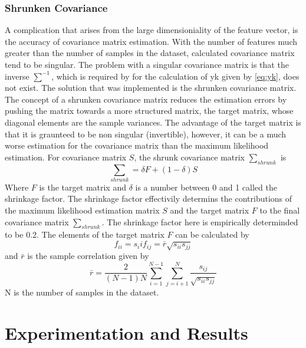 \documentclass[12pt, a4paper, fleqn]{memoir}%
\begin{document}
\subsection{Shrunken Covariance}
A complication that arises from the large dimensioniality of the feature vector, is the accuracy of covariance matrix estimation. With the number of features much greater than the number of samples in the dataset, calculated covariance matrix tend to be singular. The problem with a singular covariance matrix is that the inverse $\sum^{-1}$, which is required by for the calculation of yk given by \ref{eq:yk}, does not exist. The solution that was implemented is the shrunken covariance matrix. The concept of a shrunken covariance matrix reduces the estimation errors by pushing the matrix towards a more structured matrix, the target matrix, whose diagonal elements are the sample variances\cite{disatnik2007shrinking}. The advantage of the target matrix is that it is graunteed to be non singular (invertible), however, it can be a much worse estimation for the covariance matrix than the maximum likelihood estimation. For covariance matrix $S$, the shrunk covariance matrix $\sum_{shrunk}$ is
\begin{equation}
	\label{eq:shrunkcov}
	\sum_{shrunk} = \delta F + (1 - \delta)S
\end{equation}
Where $F$ is the target matrix and $\delta$ is a number between 0 and 1 called the shrinkage factor. The shrinkage factor effectivily determins the contributions of the maximum likelihood estimation matrix $S$ and the target matrix $F$ to the final covariance matrix $\sum_{shrunk}$. The shrinkage factor here is empirically determinded to be 0.2. The elements of the target matrix $F$ can be calculated by 
\begin{equation}
	\label{eq:f}
	f_{ii} = s_ii
	f_{ij} = \bar{r}\sqrt{s_{ii}s_{jj}}
\end{equation}
and $\bar{r}$ is the sample correlation given by
\begin{equation}
	\label{rbar}
	\bar{r} = \frac{2}{(N - 1)N}\sum^{N-1}_{i=1}\sum^{N}_{j=i+1}\frac{s_{ij}}{\sqrt{s_{ii}s_{jj}}}
\end{equation}
N is the number of samples in the dataset\cite{ledoit2004honey}.

\chapter{Experimentation and Results}
\label{chap:results}
\end{document}
